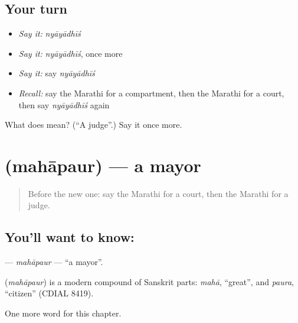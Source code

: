 \subsection*{Your turn}
\begin{itemize}
\raggedright
  \item \emph{Say it:} \emph{nyāyādhīś}
  \item \emph{Say it:} \emph{nyāyādhīś}, once more
  \item \emph{Say it:} say \emph{nyāyādhīś}
  \item \emph{Recall:} say the Marathi for a compartment, then the Marathi for a court, then say \emph{nyāyādhīś} again
\end{itemize}

\begin{tcolorbox}[breakable,colback=teal!4,colframe=teal!35!black,title={Before you move on}]
What does  mean? (\textquotedblleft{}A judge\textquotedblright{}.) Say it once more.
\end{tcolorbox}
\section[\texorpdfstring{\mr{महापौर} (mahāpaur)}{महापौर (mahāpaur)}]{ (mahāpaur) — a mayor}

\label{lesson:MR-C179-mahapaur}



\begin{quote}
Before the new one: say the Marathi for a court, then the Marathi for a judge.
\end{quote}

\subsection*{You'll want to know: }
\textbf{} — \emph{mahāpaur} — \textquotedblleft{}a mayor\textquotedblright{}.

\begin{cousinweb}
\textbf{} (\emph{mahāpaur}) is a modern compound of Sanskrit parts: \emph{mahā}, \textquotedblleft{}great\textquotedblright{}, and \emph{paura}, \textquotedblleft{}citizen\textquotedblright{} (CDIAL 8419).
\end{cousinweb}

\begin{grammarlens}[title={What you've built}]
One more word for this chapter.
\end{grammarlens}

